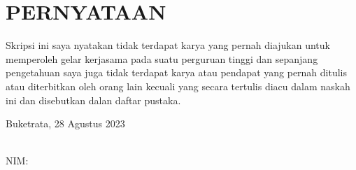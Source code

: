 \chapter*{PERNYATAAN}
Skripsi ini saya nyatakan tidak terdapat karya yang pernah diajukan untuk 
memperoleh gelar kerjasama pada suatu perguruan tinggi dan sepanjang 
pengetahuan saya juga tidak terdapat karya atau pendapat yang pernah ditulis atau 
diterbitkan oleh orang lain kecuali yang secara tertulis diacu dalam naskah ini dan 
disebutkan dalan daftar pustaka.

\vspace*{2cm}
\hspace*{8.5cm} %
\begin{minipage}[t]{0.45\linewidth} %
    \noindent
    Buketrata, 28 Agustus 2023
    
    \vspace*{2cm}
    \textbf{\mahasiswa} \\
    NIM: \nim
\end{minipage}